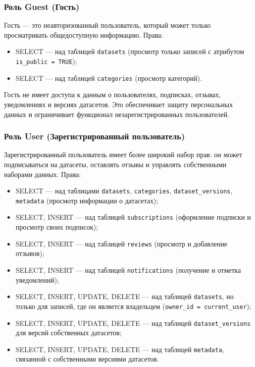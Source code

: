 \subsubsection{Роль Guest (Гость)}

Гость --- это неавторизованный пользователь, который может только
просматривать общедоступную информацию. Права:
\begin{itemize}
  \item SELECT --- над таблицей \texttt{datasets} (просмотр только записей с атрибутом \texttt{is\_public = TRUE});
  \item SELECT --- над таблицей \texttt{categories} (просмотр категорий).
\end{itemize}

Гость не имеет доступа к данным о пользователях, подписках, отзывах,
уведомлениях и версиях датасетов. Это обеспечивает защиту персональных данных и
ограничивает функционал незарегистрированных пользователей.

\subsubsection{Роль User (Зарегистрированный пользователь)}

Зарегистрированный пользователь имеет более широкий набор прав: он может
подписываться на датасеты, оставлять отзывы и управлять собственными наборами
данных. Права:
\begin{itemize}
  \item SELECT --- над таблицами \texttt{datasets}, \texttt{categories}, \texttt{dataset\_versions}, \texttt{metadata} (просмотр информации о датасетах);
  \item SELECT, INSERT --- над таблицей \texttt{subscriptions} (оформление подписки и просмотр своих подписок);
  \item SELECT, INSERT --- над таблицей \texttt{reviews} (просмотр и добавление отзывов);
  \item SELECT, INSERT --- над таблицей \texttt{notifications} (получение и отметка уведомлений);
  \item SELECT, INSERT, UPDATE, DELETE --- над таблицей \texttt{datasets}, но только для записей, где он является владельцем (\texttt{owner\_id = current\_user});
  \item SELECT, INSERT, UPDATE, DELETE --- над таблицей \texttt{dataset\_versions} для версий собственных датасетов;
  \item SELECT, INSERT, UPDATE, DELETE --- над таблицей \texttt{metadata}, связанной с собственными версиями датасетов.
\end{itemize}

